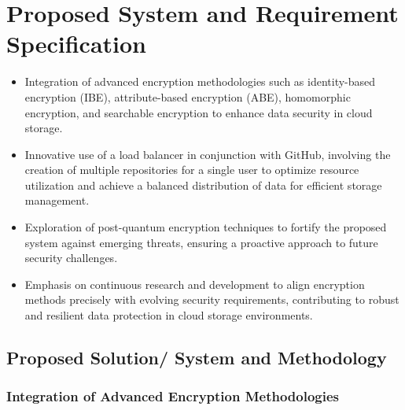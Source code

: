 \chapter{Proposed System and Requirement Specification }

\begin{itemize}
  \item Integration of advanced encryption methodologies such as identity-based encryption (IBE), attribute-based encryption (ABE), homomorphic encryption, and searchable encryption to enhance data security in cloud storage.

  \item Innovative use of a load balancer in conjunction with GitHub, involving the creation of multiple repositories for a single user to optimize resource utilization and achieve a balanced distribution of data for efficient storage management.

  \item Exploration of post-quantum encryption techniques to fortify the proposed system against emerging threats, ensuring a proactive approach to future security challenges.

  \item Emphasis on continuous research and development to align encryption methods precisely with evolving security requirements, contributing to robust and resilient data protection in cloud storage environments.
\end{itemize}

\section{Proposed Solution/ System and Methodology }

\subsection{Integration of Advanced Encryption Methodologies}

